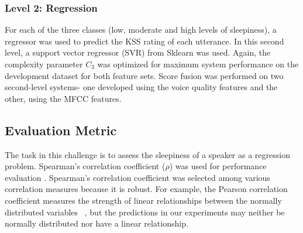 \subsubsection{Level 2: Regression}
For each of the three classes (low, moderate and high levels of sleepiness), a regressor was used to predict the KSS rating of each utterance. In this second level, a support vector regressor (SVR) from Sklearn was used. Again, the complexity parameter $C_3$
was optimized for maximum system performance on the development dataset for both feature sets. Score fusion was performed on two second-level systems- one developed using the voice quality features and the other, using the MFCC features. 
\fi

\subsection{Evaluation Metric}

The task in this challenge is to assess the sleepiness of a speaker as a regression problem. Spearman's correlation coefficient ($\rho$) was used for performance evaluation \cite{schullerinterspeech}. 
Spearman's correlation coefficient was selected among various correlation measures because it is robust. For example, the Pearson correlation coefficient measures the strength of linear relationships between the normally distributed variables ~\cite{hauke2011comparison}, but the predictions in our experiments may neither be normally distributed nor have a linear relationship. 
